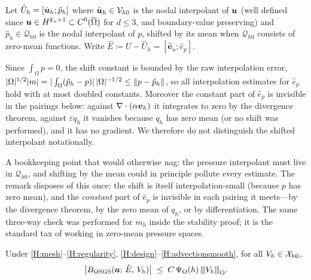 Let $\hat U_h = [\hat{\boldsymbol{u}}_h; \hat p_h]$ where $\hat{\boldsymbol{u}}_h \in \mathcal{V}_{h0}$ is the nodal
interpolant of $\boldsymbol{u}$ (well defined since $\boldsymbol{u} \in H^{k_u+1} \subset
C^0(\overline\Omega)$ for $d\le 3$, and boundary-value preserving) and
$\hat p_h \in \mathcal{Q}_{h0}$ is the nodal interpolant of $p$, shifted by its mean when
$\mathcal{Q}_{h0}$ consists of zero-mean functions. Write
$\hat E \coloneqq U - \hat U_h = [\hat{\boldsymbol e}_u; \hat e_p]$.

\begin{remark}
\label{oa:rem:meanshift}
Since $\int_\Omega p = 0$, the shift constant is bounded by the raw interpolation
error, $|\Omega|^{1/2}|m| = |\int_\Omega (\hat p_h - p)|\,|\Omega|^{-1/2}
\le \lVert p - \hat p_h \rVert$, so all interpolation estimates for $\hat e_p$ hold with at
most doubled constants. Moreover the constant part of $\hat e_p$ is invisible in the
pairings below: against $\nabla\cdot(\alpha\boldsymbol{v}_h)$ it integrates to zero by the
divergence theorem, against $\varepsilon q_h$ it vanishes because $q_h$ has zero mean
(or no shift was performed), and it has no gradient. We therefore do not distinguish
the shifted interpolant notationally.
\end{remark}

\begin{pedagogy}
A bookkeeping point that would otherwise nag: the pressure interpolant must
live in $\mathcal{Q}_{h0}$, and shifting by the mean could in principle pollute every
estimate. The remark disposes of this once: the shift is itself
interpolation-small (because $p$ has zero mean), and the \emph{constant} part
of $\hat e_p$ is invisible in each pairing it meets---by the divergence
theorem, by the zero mean of $q_h$, or by differentiation. The same three-way
check was performed for $m_h$ inside the stability proof; it is the standard
tax of working in zero-mean pressure spaces.
\end{pedagogy}

\begin{lemma}
\label{oa:lem:interpolation}
Under \cref{H:mesh}--\cref{H:regularity}, \cref{H:design}--\cref{H:advectionsmooth}, for all $V_h \in \mathcal{X}_{h0}$,
\begin{equation}
  \label{oa:eq:InterpolationBound}
  \bigl| B_{\mathrm{OSGS}}(\boldsymbol{a};\, \hat E,\, V_h) \bigr|
  \;\le\; C\,\Psi_{\mathrm O}(h)\,{\lvert\kern-0.25ex\lvert\kern-0.25ex\lvert V_h \rvert\kern-0.25ex\rvert\kern-0.25ex\rvert}_{\mathrm{O}}.
\end{equation}
\end{lemma}

